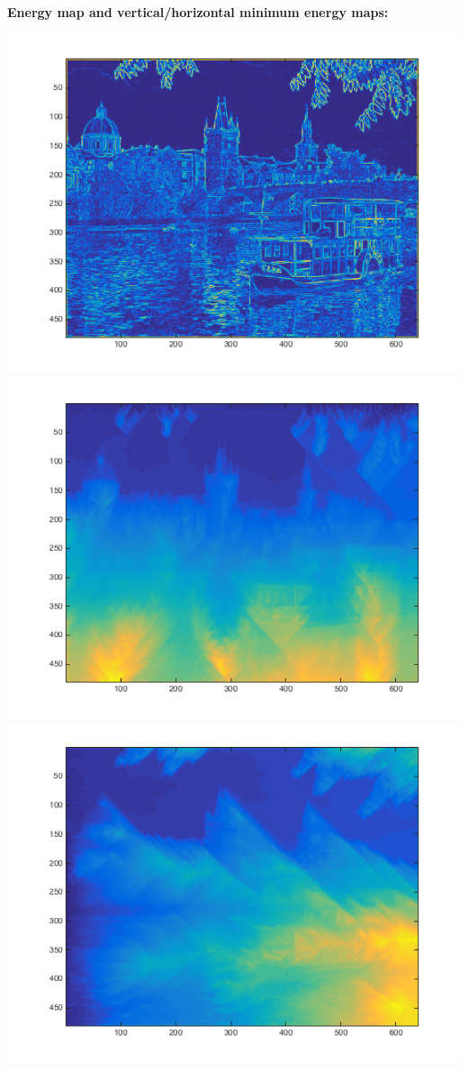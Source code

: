 \documentclass[11pt]{amsart}
\begin{document}
\subsection{}
\textbf{Energy map and vertical/horizontal minimum energy maps:} \\
\begin{center}
\includegraphics[scale=0.60]{energyMapPrague.png}
\includegraphics[scale=0.40]{energyMapVerticalPrague.png}
\includegraphics[scale=0.40]{energyMapHorizontalPrague.png}

\end{center}
\end{document}

